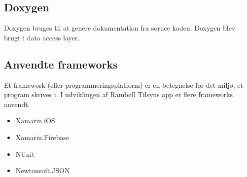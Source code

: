 \subsection*{Doxygen}
Doxygen \cite{DoxygenInfo} bruges til at genere dokumentation fra soruce koden. Doxygen blev brugt i data access layer.   

\clearpage

\subsection*{Anvendte frameworks} 
Et framework (eller programmeringsplatform) er en betegnelse for det miljø, 
et program skrives i. I udviklingen af Rambøll Tilsyns app
er flere frameworks anvendt.
\begin{itemize}[-]
	\item Xamarin.iOS \cite{XamarinDoc}
	\item Xamarin.Firebase \cite{FirebaseDoc}
	\item NUnit \cite{NUnit}
	\item Newtonsoft.JSON \cite{Newton}
		
\end{itemize}
